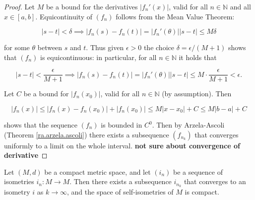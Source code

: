 \begin{proof}

Let \(M\) be a bound for the derivatives \(|f_n'(x)|\), valid for all \(n \in \mathbb{N}\) and all \(x \in [a,b]\). Equicontinuity of \((f_n)\) follows from the Mean Value Theorem:

\[
|s-t| < \delta \implies |f_n(s) - f_n(t)| = |f_n'(\theta)| |s-t| \leq M \delta
\]

for some \(\theta\) between \(s\) and \(t\). Thus given \(\epsilon > 0\) the choice \(\delta = \epsilon/(M+1)\) shows that \((f_n)\) is equicontinuous: in particular, for all \(n \in \mathbb{N}\) it holds that

\[
|s-t| < \frac{\epsilon}{M+1} \implies |f_n(s) - f_n(t)| = |f_n'(\theta)| |s-t| \leq M \cdot  \frac{\epsilon}{M+1} < \epsilon.
\]

Let \(C\) be a bound for \(|f_n(x_0)|\), valid for all \(n \in \mathbb{N}\) (by assumption). Then

\[
|f_n(x)| \leq | f_n(x) - f_n(x_0)| + |f_n(x_0)| \leq M |x - x_0| + C \leq M|b-a| + C
\]

shows that the sequence \((f_n)\) is bounded in \(C^0\). Then by Arzela-Ascoli (Theorem \ref{ra.arzela.ascoli}) there exists a subsequence \((f_{n_k})\) that converges uniformly to a limit on the whole interval. \textbf{not sure about convergence of derivative}

\end{proof}



\begin{proposition}

Let \((M,d)\) be a compact metric space, and let \((i_n)\) be a sequence of isometries \(i_n: M \to M\). Then there exists a subsequence \(i_{n_k}\) that converges to an isometry \(i\) as \(k \to \infty\), and the space of self-isometries of \(M\) is compact.

\end{proposition}

